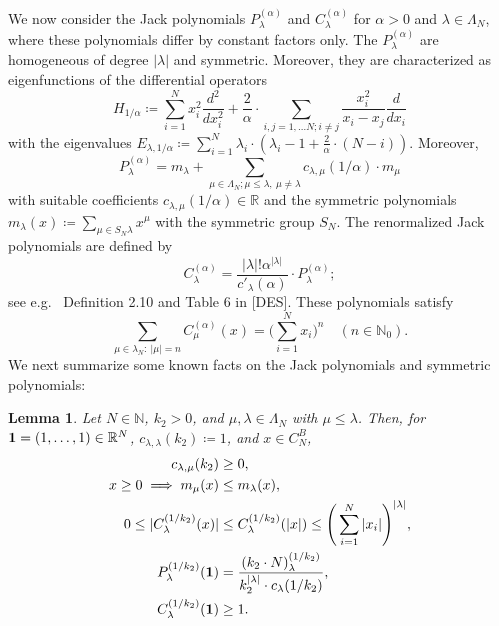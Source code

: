 \documentclass[reqno]{amsart}
\theoremstyle{plain}
\newtheorem{lemma}[theorem]{Lemma}
\theoremstyle{definition}
\numberwithin{equation}{section}
\newcommand{\R}{\mathbb{R}}
\newcommand{\N}{\mathbb{N}}
\begin{document}
We now consider the Jack polynomials $P_{\lambda}^{(\alpha)}$ and  $C_{\lambda}^{(\alpha)}$ for $\alpha>0$ and  $\lambda\in \Lambda_N$,
where these polynomials differ by constant factors only. The $P_{\lambda}^{(\alpha)}$ are homogeneous of degree $|\lambda|$ and symmetric.
Moreover,  they are characterized as eigenfunctions of the differential operators
$$H_{1/\alpha} \coloneqq \sum\limits_{i=1}^N x_i^2 \frac{d^2}{dx_i^2}+
\frac{2}{\alpha} \cdot \sum\limits_{i,j=1,\ldots N; i \ne j} \frac{x_i^2}{x_i-x_j} \frac{d}{dx_i}$$
with the eigenvalues
$E_{\lambda,1/\alpha} \coloneqq \sum\limits_{i=1}^N \lambda_i \cdot (\lambda_i-1+\frac{2}{\alpha} \cdot (N-i)).$
Moreover,
\begin{equation}\label{def-p-m-lambda}
  P_{\lambda}^{(\alpha)}= m_{\lambda}+
  \sum_{\mu \in \Lambda_N; \mu \leq \lambda, \> \mu\ne\lambda} c_{\lambda,\mu}(1/\alpha) \cdot m_{\mu}
  \end{equation}
 with suitable coefficients 
$c_{\lambda,\mu}(1/\alpha) \in \R$ and the symmetric polynomials
$m_{\lambda}(x) \coloneqq \sum_{\mu\in S_N \lambda} x^{\mu}$
with the symmetric group $S_N$. 
The renormalized Jack polynomials  are defined by
\begin{equation}\label{norming-p-c}
  C^{(\alpha)}_{\lambda}=\frac{|\lambda|!\alpha^{|\lambda|} }{ c'_{\lambda}(\alpha)} \cdot P_{\lambda}^{(\alpha)};\end{equation}
see e.g.~ Definition 2.10 and Table 6 in [DES]. These polynomials  satisfy
\begin{equation}\label{sum-identity-c}
\sum_{\mu \in \lambda_N:\>  |\mu|=n} C_{\mu}^{(\alpha)}(x)=\Bigg(\sum\limits_{i=1}^N x_i\Bigg)^n \quad(n \in \N_0).\end{equation}
We next summarize some known facts on the Jack polynomials and  symmetric polynomials:




\begin{lemma}\label{Lemma Jackpolynom}
Let $N \in \N$, $k_2>0$, and $\mu,\lambda \in \Lambda_N$ with $\mu \leq \lambda$. 
Then, for ${\bf 1}=(1,\ldots,1)\in\R^N$,  $c_{\lambda,\lambda}(k_2) \coloneqq 1$, and  $x \in C_N^B$,
\begin{align}
c_{\lambda,\mu}(k_2) &\geq 0, \label{Jack Koeffizienten nichtnegativ} \\
x \geq 0 \implies m_{\mu}(x) &\leq m_{\lambda}(x), \label{Muirhead} \\
0 \leq |C_{\lambda}^{(1/k_2)}(x)| &\leq C_{\lambda}^{(1/k_2)}(|x|) \leq \Bigg(\sum\limits_{i=1}^N |x_i|\Bigg)^{|\lambda|}, \label{Ungleichungskette C-Normierung} \\
P_{\lambda}^{(1/k_2)}({\bf 1})
&=
\frac{(k_2 \cdot N)_{\lambda}^{(1/k_2)}}{k_2^{|\lambda|} \cdot c_{\lambda}(1/k_2)}, \label{P(1)} \\
C_{\lambda}^{(1/k_2)}({\bf 1}) 
&\geq 1. \label{C(1) mind. 1}
\end{align}
\end{lemma}
\end{document}
